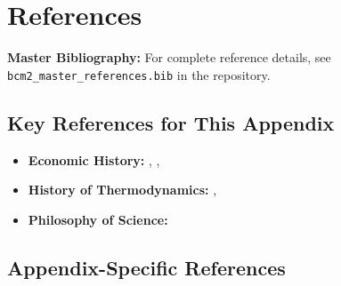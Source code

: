 \section{References}
\label{sec:thermo-references}

\begin{tcolorbox}[colback=blue!5!white, colframe=blue!75!black]
\textbf{Master Bibliography:} For complete reference details, see
\texttt{bcm2\_master\_references.bib} in the repository.
\end{tcolorbox}

\subsection{Key References for This Appendix}

\begin{itemize}[nosep]
    \item \textbf{Economic History:} \citet{landes1969unbound}, \citet{mokyr2002gifts}, \citet{allen2009british}
    \item \textbf{History of Thermodynamics:} \citet{cardwell1971watt}, \citet{smith1998science}
    \item \textbf{Philosophy of Science:} \citet{kuhn1962structure}
\end{itemize}

\subsection{Appendix-Specific References}

